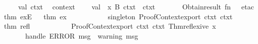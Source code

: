 \begin{isabellebody}
\ \ \ \ val\ ctxt{}\ {}\ %
\isaantiq
context{}%
\endisaantiq
{}\isanewline
\ \ \ \ val\ {}{}{}{}{}{}\ x{}{}{}\ {}B{}{}{}\ ctxt{}{}\ {}\ ctxt{}\isanewline
\ \ \ \ \ \ {}{}\ Obtain{}result\ {}fn\ {}\ {}{}\ etac\ %
\isaantiq
thm\ exE{}%
\endisaantiq
\ {}{}\ {}%
\isaantiq
thm\ ex{}%
\endisaantiq
{}{}\isanewline
\ \ {}\isanewline
\ \ \isamarkupfalse%
\ {}\isanewline
\ \ \ \ singleton\ {}ProofContext{}export\ ctxt{}\ ctxt{}{}\ %
\isaantiq
thm\ refl{}%
\endisaantiq
{}\isanewline
\ \ {}\isanewline
\ \ \isamarkupfalse%
\ {}\isanewline
\ \ \ \ ProofContext{}export\ ctxt{}\ ctxt{}\ {}Thm{}reflexive\ x{}\isanewline
\ \ \ \ \ \ handle\ ERROR\ msg\ {}{}\ {}warning\ msg{}\ {}{}{}{}\isanewline
\ \ {}\isanewline
{}\isamarkupfalse%
%
\endisatagML
{\isafoldML}%
%
\isadelimML
\isanewline
%
\endisadelimML
%
\isadelimtheory
\isanewline
%
\endisadelimtheory
%
\isatagtheory
{}\isamarkupfalse%
%
\endisatagtheory
{\isafoldtheory}%
%
\isadelimtheory
\isanewline
%
\endisadelimtheory
\end{isabellebody}%
